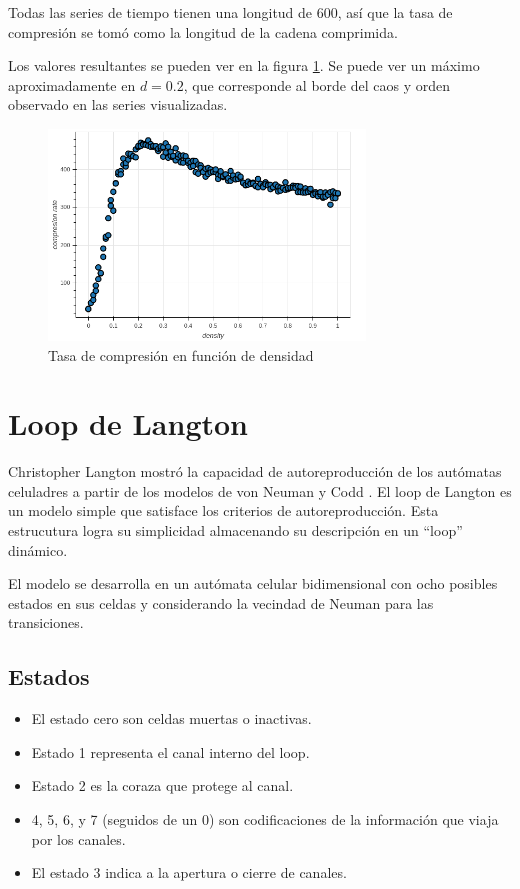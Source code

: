 \documentclass{article}
\begin{document}
Todas las series de tiempo tienen una longitud de 600, así que la tasa de
compresión se tomó como la longitud de la cadena comprimida.

Los valores resultantes se pueden ver en la figura \ref{fig:ant-compress}. Se
puede ver un máximo aproximadamente en $d=0.2$, que corresponde al borde del
caos y orden observado en las series visualizadas.

\begin{figure}
  \centering
  \includegraphics[width=0.75\textwidth]{imgs/compression.png}
  \caption{Tasa de compresión en función de densidad}
  \label{fig:ant-compress}
\end{figure}

\section{Loop de Langton}

Christopher Langton mostró la capacidad de autoreproducción de los autómatas
celuladres a partir de los modelos de von Neuman y Codd
\cite{langton84_self_reprod_cellul_autom}. El loop de Langton es un modelo
simple que satisface los criterios de autoreproducción. Esta estrucutura logra
su simplicidad almacenando su descripción en un ``loop'' dinámico.

El modelo se desarrolla en un autómata celular bidimensional con ocho posibles
estados en sus celdas y considerando la vecindad de Neuman para las
transiciones.

\subsection{Estados}

\begin{itemize}
  \item El estado cero son celdas muertas o inactivas.
  \item Estado 1 representa el canal interno del loop.
  \item Estado 2 es la coraza que protege al canal.
  \item 4, 5, 6, y 7 (seguidos de un 0) son codificaciones de la información
    que viaja por los canales.
  \item El estado 3 indica a la apertura o cierre de canales.
\end{itemize}
\end{document}
